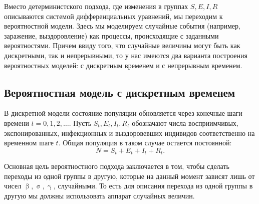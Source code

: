 \documentclass[a4paper, 14pt]{extreport}
\numberwithin{equation}{section}
\renewcommand{\beta}{\upbeta}
\renewcommand{\gamma}{\upgamma}
\renewcommand{\sigma}{\upsigma}
\begin{document}
	Вместо детерминистского подхода, где изменения в группах $S, E, I, R$ описываются системой дифференциальных уравнений, мы переходим к вероятностной модели. Здесь мы моделируем случайные события (например, заражение, выздоровление) как процессы, происходящие с заданными вероятностями. Причем ввиду того, что случайные величины могут быть как дискретными, так и непрерывными, то у нас имеются два варианта построения вероятностных моделей: с дискретным временем и с непрерывным временем.
	
	\subsection{Вероятностная модель с дискретным временем}
	В дискретной модели состояние популяции обновляется через конечные шаги времени 
	$t=0,1,2,\ldots$. Пусть $S_t, E_t, I_t, R_t$
	обозначают числа восприимчивых, экспонированных, инфекционных и выздоровевших индивидов соответственно на временном шаге $t$. Общая популяция в таком случае остается постоянной:
	$$N = S_t + E_t + I_t + R_t.$$
	
	Основная цель вероятностного подхода заключается в том, чтобы сделать переходы из одной группы в другую, которые на данный момент зависят лишь от чисел $\beta, \sigma,\gamma$, случайными. То есть для описания перехода из одной группы в другую мы должны использовать аппарат случайных величин.
	
\end{document}
